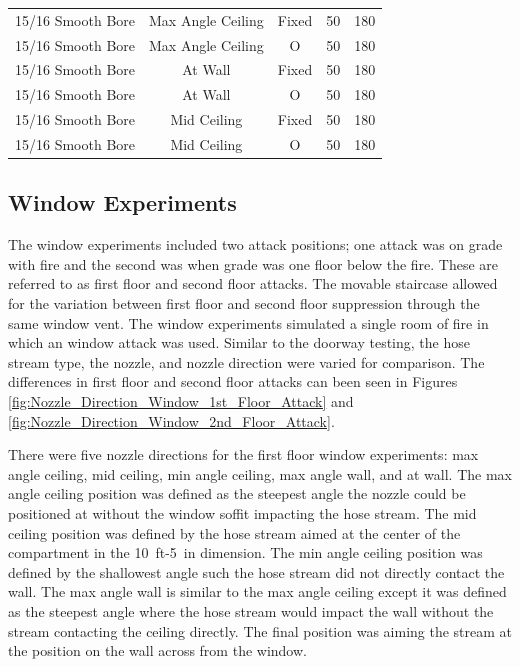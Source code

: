 \documentclass[12pt,oneside]{book}
\begin{document}
\begin{table}[!ht]
\begin{tabular}{ccccc}
15/16 Smooth Bore & Max Angle Ceiling   & Fixed   & 50 & 180 \\
15/16 Smooth Bore & Max Angle Ceiling   & O & 50  & 180 \\
15/16 Smooth Bore & At Wall     		& Fixed   & 50 & 180 \\
15/16 Smooth Bore & At Wall     		& O & 50  & 180 \\
15/16 Smooth Bore & Mid Ceiling 		& Fixed   & 50 & 180 \\
15/16 Smooth Bore & Mid Ceiling 		& O & 50  & 180 \\
\bottomrule[1.25pt]
\end{tabular}
\end{table}

\clearpage

\subsection{Window Experiments}
\label{ext_tests}

The window experiments included two attack positions; one attack was on grade with fire and the second was when grade was one floor below the fire. These are referred to as first floor and second floor attacks. The movable staircase allowed for the variation between first floor and second floor suppression through the same window vent. The window experiments simulated a single room of fire in which an window attack was used. Similar to the doorway testing, the hose stream type, the nozzle, and nozzle direction were varied for comparison. The differences in first floor and second floor attacks can been seen in Figures \ref{fig:Nozzle_Direction_Window_1st_Floor_Attack} and \ref{fig:Nozzle_Direction_Window_2nd_Floor_Attack}. 

There were five nozzle directions for the first floor window experiments: max angle ceiling, mid ceiling, min angle ceiling, max angle wall, and at wall. The max angle ceiling position was defined as the steepest angle the nozzle could be positioned at without the window soffit impacting the hose stream. The mid ceiling position was defined by the hose stream aimed at the center of the compartment in the 10~ft-5~in dimension. The min angle ceiling position was defined by the shallowest angle such the hose stream did not directly contact the wall. The max angle wall is similar to the max angle ceiling except it was defined as the steepest angle where the hose stream would impact the wall without the stream contacting the ceiling directly. The final position was aiming the stream at the position on the wall across from the window.
\end{document}
